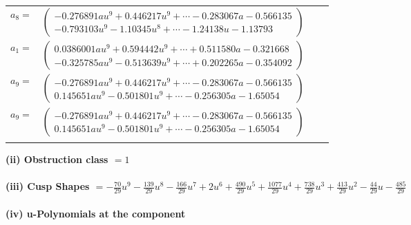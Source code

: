\documentclass[1p]{elsarticle_modified}
\theoremstyle{definition}
\begin{document}
\begin{tabular}{m{7pt} m{180pt} m{7pt} m{180pt} }
\flushright $a_{8}=$&$\begin{pmatrix}-0.276891 a u^{9}+0.446217 u^{9}+\cdots-0.283067 a-0.566135\\-0.793103 u^{9}-1.10345 u^{8}+\cdots-1.24138 u-1.13793\end{pmatrix}$ \\
\flushright $a_{1}=$&$\begin{pmatrix}0.0386001 a u^{9}+0.594442 u^{9}+\cdots+0.511580 a-0.321668\\-0.325785 a u^{9}-0.513639 u^{9}+\cdots+0.202265 a-0.354092\end{pmatrix}$ \\
\flushright $a_{9}=$&$\begin{pmatrix}-0.276891 a u^{9}+0.446217 u^{9}+\cdots-0.283067 a-0.566135\\0.145651 a u^{9}-0.501801 u^{9}+\cdots-0.256305 a-1.65054\end{pmatrix}$\\ \flushright $a_{9}=$&$\begin{pmatrix}-0.276891 a u^{9}+0.446217 u^{9}+\cdots-0.283067 a-0.566135\\0.145651 a u^{9}-0.501801 u^{9}+\cdots-0.256305 a-1.65054\end{pmatrix}$\\&\end{tabular}
\flushleft \textbf{(ii) Obstruction class $= 1$}\\~\\
\flushleft \textbf{(iii) Cusp Shapes $= -\frac{70}{29} u^9-\frac{139}{29} u^8-\frac{166}{29} u^7+2 u^6+\frac{490}{29} u^5+\frac{1077}{29} u^4+\frac{738}{29} u^3+\frac{413}{29} u^2-\frac{44}{29} u-\frac{485}{29}$}\\~\\
\newpage\renewcommand{\arraystretch}{1}
\flushleft \textbf{(iv) u-Polynomials at the component}\newline \\
\end{document}
